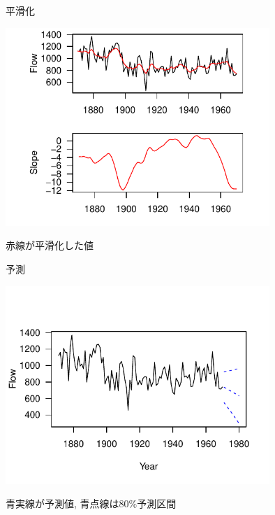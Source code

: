 \documentclass[dvipdfmx,12pt]{beamer}
\begin{document}
\begin{frame}{平滑化}

\begin{center}
\includegraphics[width=10cm]{dlm2_smooth}
\end{center}

赤線が平滑化した値
\end{frame}

\begin{frame}{予測}

\begin{center}
\includegraphics[width=10cm]{dlm2_predict}
\end{center}

青実線が予測値, 青点線は80\%予測区間
\end{frame}
\end{document}
